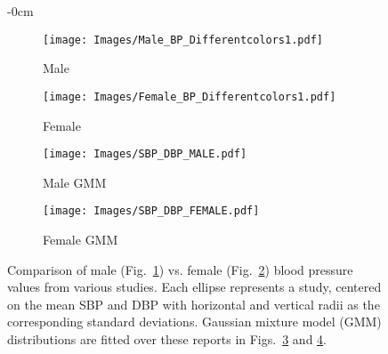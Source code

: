 \documentclass[journal,article,moreauthors]{Definitions/mdpi}
\begin{document}
\begin{figure}[tb]
  \begin{adjustwidth}{-\extralength}{0cm}
  \centering
  \hfill
  \begin{subfigure}{0.25\columnwidth}
   \texttt{[image: Images/Male\_BP\_Differentcolors1.pdf]}
    \caption{Male}
    \label{Fig:MaleandBP}
  \end{subfigure}%
  \hfill
  \begin{subfigure}{0.25\columnwidth}
   \texttt{[image: Images/Female\_BP\_Differentcolors1.pdf]}
    \caption{Female}
    \label{Fig:FemaleandBP}
  \end{subfigure}%
  \hfill
  \begin{subfigure}{0.25\columnwidth}
   \texttt{[image: Images/SBP\_DBP\_MALE.pdf]}
    \caption{Male GMM}
    \label{Fig:MaleGMM}
  \end{subfigure}%
  \hfill
  \begin{subfigure}{0.25\columnwidth}
   \texttt{[image: Images/SBP\_DBP\_FEMALE.pdf]}
    \caption{Female GMM}
    \label{Fig:FemaleGMM}
  \end{subfigure}
  \hfill
  \caption{Comparison of male (Fig.~\ref{Fig:MaleandBP}) vs. female (Fig.~\ref{Fig:FemaleandBP}) blood pressure values from various studies. Each ellipse represents a study, centered on the mean SBP and DBP with horizontal and vertical radii as the corresponding standard deviations. Gaussian mixture model (GMM) distributions are fitted over these reports in Figs.~\ref{Fig:MaleGMM} and \ref{Fig:FemaleGMM}.}
  \label{Fig:GenderandBP}
  \end{adjustwidth}
\end{figure}

\end{document}
